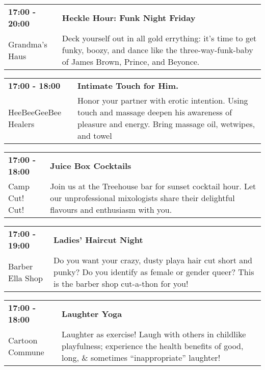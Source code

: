 \begin{tabular}{ p{1in} p{2.2in} }
    \textbf{17:00 - 20:00} & \textbf{Heckle Hour: Funk Night Friday} \\
    Grandma's Haus \newline  & Deck yourself out in all gold errything: it's time to get funky, boozy, and dance like the three-way-funk-baby of James Brown, Prince, and Beyonce. \\
    \hline 
\end{tabular}
    
\begin{tabular}{ p{1in} p{2.2in} }
    \textbf{17:00 - 18:00} & \textbf{Intimate Touch for Him. } \\
    HeeBeeGeeBee Healers \newline  & Honor your partner with erotic intention. Using touch and massage deepen his awareness of pleasure and energy. Bring massage oil, wetwipes, and towel \\
    \hline 
\end{tabular}
    
\begin{tabular}{ p{1in} p{2.2in} }
    \textbf{17:00 - 18:00} & \textbf{Juice Box Cocktails} \\
    Camp Cut! Cut! \newline  & Join us at the Treehouse bar for sunset cocktail hour. Let our unprofessional mixologists share their  delightful flavours and enthusiasm with you. \\
    \hline 
\end{tabular}
    
\begin{tabular}{ p{1in} p{2.2in} }
    \textbf{17:00 - 19:00} & \textbf{Ladies' Haircut Night} \\
    Barber Ella Shop \newline  & Do you want your crazy, dusty playa hair cut short and punky? Do you identify as female or gender queer? This is the barber shop cut-a-thon for you! \\
    \hline 
\end{tabular}
    
\begin{tabular}{ p{1in} p{2.2in} }
    \textbf{17:00 - 18:00} & \textbf{Laughter Yoga} \\
    Cartoon Commune \newline  & Laughter as exercise! Laugh with others in childlike playfulness; experience the health benefits of good, long, \& sometimes ``inappropriate'' laughter! \\
    \hline 
\end{tabular}
    
